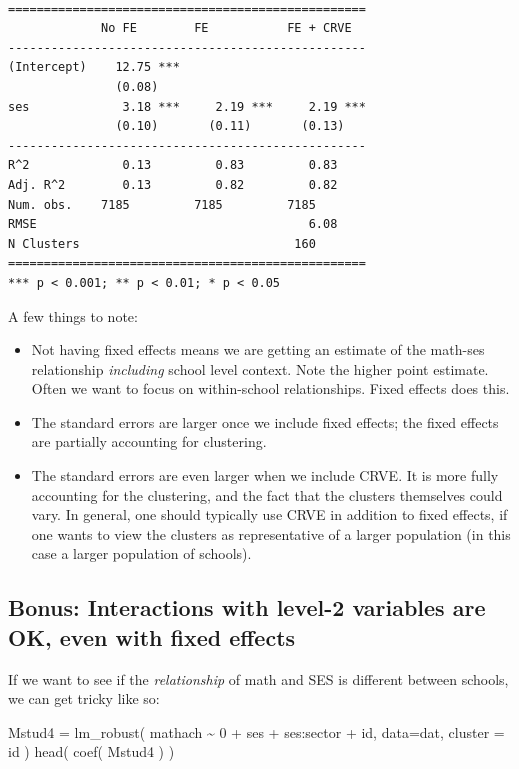 \documentclass[
  letterpaper,
  DIV=11,
  numbers=noendperiod]{scrreprt}
\newenvironment{Shaded}{}{}
\newcommand{\AttributeTok}[1]{\textcolor[rgb]{0.49,0.56,0.16}{#1}}
\newcommand{\DecValTok}[1]{\textcolor[rgb]{0.25,0.63,0.44}{#1}}
\newcommand{\FunctionTok}[1]{\textcolor[rgb]{0.02,0.16,0.49}{#1}}
\newcommand{\NormalTok}[1]{#1}
\newcommand{\OtherTok}[1]{\textcolor[rgb]{0.00,0.44,0.13}{#1}}
\newcommand{\SpecialCharTok}[1]{\textcolor[rgb]{0.25,0.44,0.63}{#1}}
\providecommand{\tightlist}{%
  \setlength{\itemsep}{0pt}\setlength{\parskip}{0pt}}\usepackage{longtable,booktabs,array}
\begin{document}
\begin{verbatim}

==================================================
             No FE        FE           FE + CRVE  
--------------------------------------------------
(Intercept)    12.75 ***                          
               (0.08)                             
ses             3.18 ***     2.19 ***     2.19 ***
               (0.10)       (0.11)       (0.13)   
--------------------------------------------------
R^2             0.13         0.83         0.83    
Adj. R^2        0.13         0.82         0.82    
Num. obs.    7185         7185         7185       
RMSE                                      6.08    
N Clusters                              160       
==================================================
*** p < 0.001; ** p < 0.01; * p < 0.05
\end{verbatim}

A few things to note:

\begin{itemize}
\tightlist
\item
  Not having fixed effects means we are getting an estimate of the
  math-ses relationship \emph{including} school level context. Note the
  higher point estimate. Often we want to focus on within-school
  relationships. Fixed effects does this.
\item
  The standard errors are larger once we include fixed effects; the
  fixed effects are partially accounting for clustering.
\item
  The standard errors are even larger when we include CRVE. It is more
  fully accounting for the clustering, and the fact that the clusters
  themselves could vary. In general, one should typically use CRVE in
  addition to fixed effects, if one wants to view the clusters as
  representative of a larger population (in this case a larger
  population of schools).
\end{itemize}

\subsection{Bonus: Interactions with level-2 variables are OK, even with
fixed
effects}\label{bonus-interactions-with-level-2-variables-are-ok-even-with-fixed-effects}

If we want to see if the \emph{relationship} of math and SES is
different between schools, we can get tricky like so:

\begin{Shaded}
\begin{Highlighting}[]
\NormalTok{Mstud4 }\OtherTok{=} \FunctionTok{lm\_robust}\NormalTok{( mathach }\SpecialCharTok{\textasciitilde{}} \DecValTok{0} \SpecialCharTok{+}\NormalTok{ ses }\SpecialCharTok{+}\NormalTok{ ses}\SpecialCharTok{:}\NormalTok{sector }\SpecialCharTok{+}\NormalTok{ id, }
                    \AttributeTok{data=}\NormalTok{dat,}
                    \AttributeTok{cluster =}\NormalTok{ id )}
\FunctionTok{head}\NormalTok{( }\FunctionTok{coef}\NormalTok{( Mstud4 ) )}
\end{Highlighting}
\end{Shaded}
\end{document}
